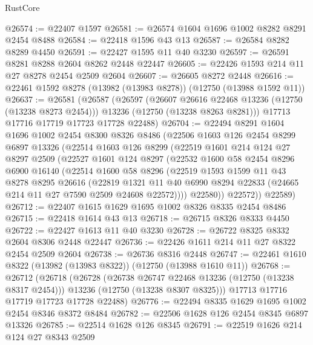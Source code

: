 \begin{lexlean}{RustCore}
\begin{coremodule}
@26574 := @22407 @1597
@26581 := @26574 @1604 @1696 @1002 @8282 @8291 @2454 @8488
@26584 := @22418 @1596 @43 @13
@26587 := @26584 @8282 @8289 @4450
@26591 := @22427 @1595 @11 @40 @3230
@26597 := @26591 @8281 @8288 @2604 @8262 @2448 @22447
@26605 := @22426 @1593 @214 @11 @27 @8278 @2454 @2509 @2604
@26607 := @26605 @8272 @2448
@26616 := @22461 @1592 @8278 (@13982 (@13983 @8278)) (@12750 (@13988 @1592 @11))
@26637 := @26581
    (@26587
      (@26597
        (@26607 @26616 @22468 @13236 (@12750 (@13238 @8273 @2454)))
        @13236
        (@12750 (@13238 @8263 @8281)))
      @17713
      @17716
      @17719
      @17723
      @17728
      @22488)
@26704 := @22494
    @8291
    @1604
    @1696
    @1002
    @2454
    @8300
    @8326
    @8486
    (@22506
      @1603
      @126
      @2454
      @8299
      @6897
      @13326
      (@22514
        @1603
        @126
        @8299
        (@22519
          @1601
          @214
          @124
          @27
          @8297
          @2509
          (@22527
            @1601
            @124
            @8297
            (@22532
              @1600
              @58
              @2454
              @8296
              @6900
              @16140
              (@22514
                @1600
                @58
                @8296
                (@22519
                  @1593
                  @1599
                  @11
                  @43
                  @8278
                  @8295
                  @26616
                  (@22819
                    @1321
                    @11
                    @40
                    @6990
                    @8294
                    @22833
                    (@24665 @214 @11 @27 @7590 @2509 @24608 @22572))))
              @22580))
          @22572))
      @22589)
@26712 := @22407 @1615 @1629 @1695 @1002 @8326 @8335 @2454 @8486
@26715 := @22418 @1614 @43 @13
@26718 := @26715 @8326 @8333 @4450
@26722 := @22427 @1613 @11 @40 @3230
@26728 := @26722 @8325 @8332 @2604 @8306 @2448 @22447
@26736 := @22426 @1611 @214 @11 @27 @8322 @2454 @2509 @2604
@26738 := @26736 @8316 @2448
@26747 := @22461 @1610 @8322 (@13982 (@13983 @8322)) (@12750 (@13988 @1610 @11))
@26768 := @26712
    (@26718
      (@26728
        (@26738 @26747 @22468 @13236 (@12750 (@13238 @8317 @2454)))
        @13236
        (@12750 (@13238 @8307 @8325)))
      @17713
      @17716
      @17719
      @17723
      @17728
      @22488)
@26776 := @22494 @8335 @1629 @1695 @1002 @2454 @8346 @8372 @8484
@26782 := @22506 @1628 @126 @2454 @8345 @6897 @13326
@26785 := @22514 @1628 @126 @8345
@26791 := @22519 @1626 @214 @124 @27 @8343 @2509

\end{coremodule}
\end{lexlean}
